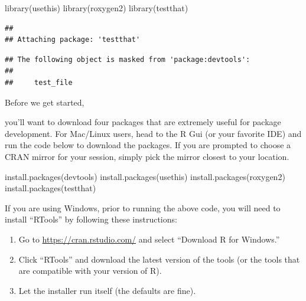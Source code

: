 \documentclass[
]{book}
\newenvironment{Shaded}{\begin{snugshade}}{\end{snugshade}}
\newcommand{\FunctionTok}[1]{\textcolor[rgb]{0.00,0.00,0.00}{#1}}
\newcommand{\NormalTok}[1]{#1}
\newcommand{\StringTok}[1]{\textcolor[rgb]{0.31,0.60,0.02}{#1}}
\begin{document}
\begin{Shaded}
\begin{Highlighting}[]
\FunctionTok{library}\NormalTok{(}\StringTok{\textquotesingle{}usethis\textquotesingle{}}\NormalTok{)}
\FunctionTok{library}\NormalTok{(}\StringTok{\textquotesingle{}roxygen2\textquotesingle{}}\NormalTok{)}
\FunctionTok{library}\NormalTok{(}\StringTok{\textquotesingle{}testthat\textquotesingle{}}\NormalTok{)}
\end{Highlighting}
\end{Shaded}

\begin{verbatim}
## 
## Attaching package: 'testthat'
\end{verbatim}

\begin{verbatim}
## The following object is masked from 'package:devtools':
## 
##     test_file
\end{verbatim}

Before we get started,

you'll want to download four packages that are extremely useful for package development. For Mac/Linux users, head to the R Gui (or your favorite IDE) and run the code below to download the packages. If you are prompted to choose a CRAN mirror for your session, simply pick the mirror closest to your location.

\begin{Shaded}
\begin{Highlighting}[]
\FunctionTok{install.packages}\NormalTok{(}\StringTok{\textquotesingle{}devtools\textquotesingle{}}\NormalTok{)}
\FunctionTok{install.packages}\NormalTok{(}\StringTok{\textquotesingle{}usethis\textquotesingle{}}\NormalTok{)}
\FunctionTok{install.packages}\NormalTok{(}\StringTok{\textquotesingle{}roxygen2\textquotesingle{}}\NormalTok{)}
\FunctionTok{install.packages}\NormalTok{(}\StringTok{\textquotesingle{}testthat\textquotesingle{}}\NormalTok{)}
\end{Highlighting}
\end{Shaded}

If you are using Windows, prior to running the above code, you will need to install ``RTools'' by following these instructions:

\begin{enumerate}
\def\labelenumi{\arabic{enumi}.}
\item
  Go to \url{https://cran.rstudio.com/} and select ``Download R for Windows.''
\item
  Click ``RTools'' and download the latest version of the tools (or the tools that are compatible with your version of R).
\item
  Let the installer run itself (the defaults are fine).
\end{enumerate}
\end{document}
